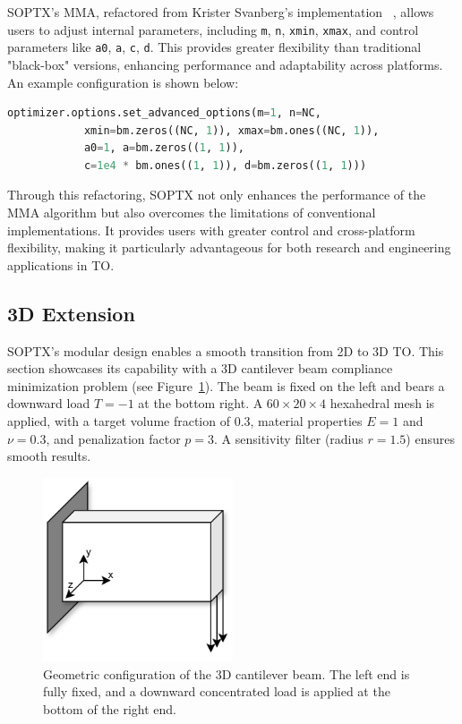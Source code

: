 \documentclass[mathpazo]{cicp}
\begin{document}
SOPTX’s MMA, refactored from Krister Svanberg’s implementation ~\cite{Svanberg2007MmaAG}, allows users to adjust internal parameters, including \texttt{m}, \texttt{n}, \texttt{xmin}, \texttt{xmax}, and control parameters like \texttt{a0}, \texttt{a}, \texttt{c}, \texttt{d}. This provides greater flexibility than traditional "black-box" versions, enhancing performance and adaptability across platforms. An example configuration is shown below:
\begin{lstlisting}[language=python]
optimizer.options.set_advanced_options(m=1, n=NC,
			xmin=bm.zeros((NC, 1)), xmax=bm.ones((NC, 1)),
			a0=1, a=bm.zeros((1, 1)),
			c=1e4 * bm.ones((1, 1)), d=bm.zeros((1, 1)))
\end{lstlisting}

Through this refactoring, SOPTX not only enhances the performance of the MMA algorithm but also overcomes the limitations of conventional implementations. It provides users with greater control and cross-platform flexibility, making it particularly advantageous for both research and engineering applications in TO.

\subsection{3D Extension}\label{sec:exp_canti3d}
SOPTX’s modular design enables a smooth transition from 2D to 3D TO. This section showcases its capability with a 3D cantilever beam compliance minimization problem (see Figure~\ref{fig:cantilever_3d}). The beam is fixed on the left and bears a downward load $T=-1$ at the bottom right. A $60\times20\times4$ hexahedral mesh is applied, with a target volume fraction of 0.3, material properties $E=1$ and $\nu=0.3$, and penalization factor $p=3$. A sensitivity filter (radius $r=1.5$) ensures smooth results.
\begin{figure}[htbp]
	\centering
	\includegraphics[width=0.5\textwidth]{figures/cantilever_3d.png}
	\caption{Geometric configuration of the 3D cantilever beam. The left end is fully fixed, and a downward concentrated load is applied at the bottom of the right end.}
	\label{fig:cantilever_3d}
\end{figure}
\end{document}
